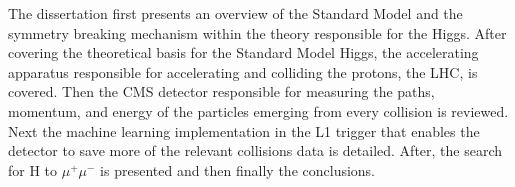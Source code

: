The dissertation first presents an overview of the Standard Model and the symmetry breaking mechanism within the theory responsible for the Higgs. After covering the theoretical basis for the Standard Model Higgs, the accelerating apparatus responsible for accelerating and colliding the protons, the LHC, is covered. Then the CMS detector responsible for measuring the paths, momentum, and energy of the particles emerging from every collision is reviewed. Next the machine learning implementation in the L1 trigger that enables the detector to save more of the relevant collisions data is detailed. After, the search for H to $\mu^{+}\mu^{-}$ is presented and then finally the conclusions.
